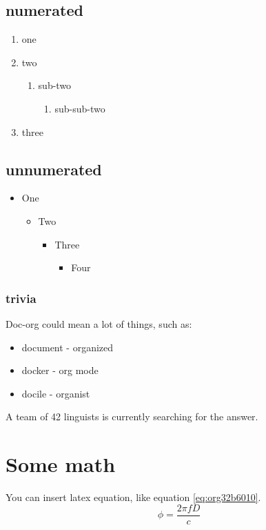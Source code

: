 \subsection{numerated}
\label{sec:orgb00d347}
\begin{enumerate}
\item one
\item two
\begin{enumerate}
\item sub-two
\begin{enumerate}
\item sub-sub-two
\end{enumerate}
\end{enumerate}
\item three
\end{enumerate}

\subsection{unnumerated}
\label{sec:orgdf3a266}
\begin{itemize}
\item One
\begin{itemize}
\item Two
\begin{itemize}
\item Three
\begin{itemize}
\item Four
\end{itemize}
\end{itemize}
\end{itemize}
\end{itemize}

\subsubsection{trivia}
\label{sec:orge5559f4}
Doc-org could mean a lot of things, such as:
\begin{itemize}
\item document - organized
\item docker - org mode
\item docile - organist
\end{itemize}
A team of 42 linguists is currently searching for the answer.

\section{Some math}
\label{sec:org07363ab}
You can insert latex equation, like equation \ref{eq:org32b6010}.
\begin{equation}
\label{eq:org32b6010}
\phi = \frac{2\pi fD}{c}
\end{equation}

